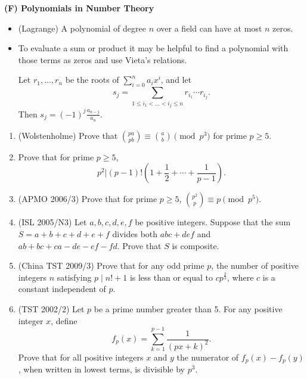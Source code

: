 \noindent \textbf{(F) Polynomials in Number Theory}
\begin{itemize}
\item (Lagrange) A polynomial of degree $n$ over a field can have at most $n$ zeros.
\item To evaluate a sum or product it may be helpful to find a polynomial with those terms as zeros and use Vieta's relations.
\begin{thm}
Let $r_1,\ldots, r_n$ be the roots of $\sum_{i=0}^n a_ix^i$, and let \[s_j=\sum_{1\leq i_1<\ldots<i_j\leq n}r_{i_1}\cdots r_{i_j}.\] Then $s_j=(-1)^j\frac{a_{n-j}}{a_n}$.
\end{thm}
\end{itemize}
\begin{enumerate}
\item (Wolstenholme) Prove that $\binom{pa}{pb}\equiv \binom{a}{b}\pmod{p^3}$ for prime $p\geq 5$.

\item Prove that for prime $p\geq 5$,
\[p^2|(p-1)!\left(1+\frac{1}{2}+\cdots +\frac{1}{p-1}\right).\]

\item (APMO 2006/3) Prove that for prime $p\geq 5$, $\binom{p^2}{p}\equiv p \pmod{p^5}$.

\item (ISL 2005/N3) Let $a,b,c,d,e,f$ be positive integers. Suppose that the sum $S=a+b+c+d+e+f$ divides both $abc+def$ and $ab+bc+ca-de-ef-fd$. Prove that $S$ is composite.

\item (China TST 2009/3) Prove that for any odd prime $p$, the number of positive integers $n$ satisfying $p\mid n!+1$ is less than or equal to $cp^{\frac{2}{3}}$, where $c$ is a constant independent of $p$.

\item (TST 2002/2) Let $p$ be a prime number greater than 5. For any positive integer $x$, define
\[f_p(x)=\sum_{k=1}^{p-1}\frac{1}{(px+k)^2}.\]
Prove that for all positive integers $x$ and $y$ the numerator of $f_p(x)-f_p(y)$, when written in lowest terms, is divisible by $p^3$.
\end{enumerate}

